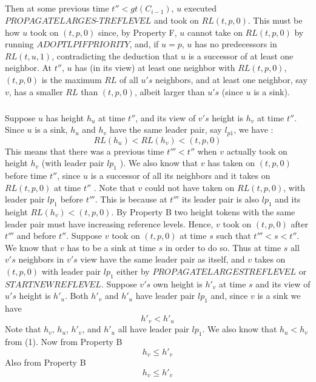 \subparagraph{}Then at some previous time $t'' < gt(C_{i-1})$, $u$ executed $PROPAGATELARGES$-$TREFLEVEL$ and took on $RL (t, p, 0)$. This must be how $u$ took on $(t, p, 0)$ since, by Property F, $u$ cannot take on $RL (t, p, 0)$ by running $ADOPTLPIFPRIORITY$, and, if $u = p$, $u$ has no predecessors in $RL (t, u, 1)$, contradicting the deduction that $u$ is a successor of at least one neighbor. At $t''$, $u$ has (in its view) at least one neighbor with $RL (t, p, 0)$, $(t, p, 0)$ is the maximum $RL$ of all $u's$ neighbors, and at least one neighbor, say $v$, has a smaller $RL$ than $(t, p, 0)$, albeit larger than $u's$ (since $u$ is a sink).
\subparagraph{}Suppose $u$ has height $h_u$ at time $t''$, and its view of $v's$ height is $h_v$ at time $t''$. Since $u$ is a sink, $h_u$ and $h_v$ have the same leader pair, say $l_{p1}$, we have :
\begin{equation}
RL(h_u ) < RL(h_v ) < (t, p, 0)
\end{equation}
This means that there was a previous time $t ''' < t ''$ when $v$ actually took on height $h_v$ (with leader pair $lp_1$ ). We also know that $v$ has taken on $(t, p, 0)$ before time $t ''$, since $u$ is a successor of all its neighbors and it takes on $RL (t, p, 0)$ at time $t ''$ . Note that $v$ could not have taken on $RL (t, p, 0)$, with leader pair $lp_1$ before $t '''$. This is because at $t '''$ its leader pair is also $lp_1$ and its height $RL(h_v ) < (t, p, 0)$. By Property B two height tokens with the same leader pair must have increasing reference levels. Hence, $v$ took on $(t, p, 0)$ after $t '''$ and before $t ''$. Suppose $v$ took on $(t, p, 0)$ at time $s$ such that $t ''' < s < t ''$. We know that $v$ has to be a sink at time $s$ in order to do so. Thus at time $s$ all $v's$ neighbors in $v's$ view have the same leader pair as itself, and $v$ takes on $(t, p, 0)$ with leader pair $lp_1$ either by $PROPAGATELARGESTREFLEVEL$ or $STARTNEWREFLEVEL$. Suppose $v's$ own height is $h'_v$ at time $s$ and its view of $u's$ height is $h'_u$. Both $h'_v$ and $h'_u$ have leader pair $lp_1$ and, since $v$ is a sink we have
\begin{equation}
h'_v < h'_u
\end{equation}
Note that $h_v$, $h_u$, $h'_v$, and $h'_u$ all have leader pair $lp_1$. We also know that $h_u < h_v$ from (1). Now from Property B
\begin{equation}
h_v \leq h'_v
\end{equation}
Also from Property B
\begin{equation}
h_v \leq h'_v
\end{equation}
